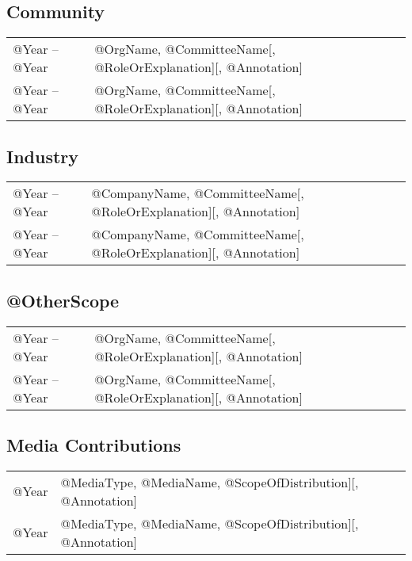 \documentclass[10pt]{article}
\begin{document}
\begin{IOWA ONLY}
\subsection*{Community}

\begin{tabular}{l@{\quad\ }p{34em}} 
 @Year -- @Year 
 & @OrgName, @CommitteeName[, @RoleOrExplanation][, @Annotation]
 \\[.5ex]
 @Year -- @Year 
 & @OrgName, @CommitteeName[, @RoleOrExplanation][, @Annotation]
\end{tabular}

\subsection*{Industry}

\begin{tabular}{l@{\quad\ }p{34em}} 
 @Year -- @Year 
 & @CompanyName, @CommitteeName[, @RoleOrExplanation][, @Annotation]
 \\[.5ex]
 @Year -- @Year 
 & @CompanyName, @CommitteeName[, @RoleOrExplanation][, @Annotation]
\end{tabular}

\subsection*{@OtherScope}

\begin{tabular}{l@{\quad\ }p{34em}} 
 @Year -- @Year 
 & @OrgName, @CommitteeName[, @RoleOrExplanation][, @Annotation]
 \\[.5ex]
 @Year -- @Year 
 & @OrgName, @CommitteeName[, @RoleOrExplanation][, @Annotation]
\end{tabular}

\subsection*{Media Contributions}

\begin{tabular}{l@{\quad\ }p{34em}} 
 @Year  & @MediaType, @MediaName, @ScopeOfDistribution][, @Annotation]
 \\[.5ex]
 @Year  & @MediaType, @MediaName, @ScopeOfDistribution][, @Annotation]
\end{tabular}


\end{IOWA ONLY}
\end{document}
